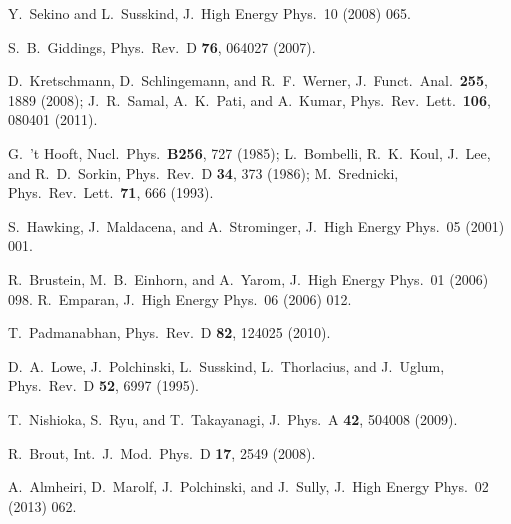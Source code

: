 \documentclass[aps,showpacs,prl,12pt]{revtex4}
\begin{document}
\begin{thebibliography}{16}
 Y.\ Sekino and L.\ Susskind,
J.\ High Energy Phys.\ 10 (2008) 065.

 S.\ B.\ Giddings,
Phys.\ Rev.\ D {\bf 76}, 064027 (2007).

 D.\ Kretschmann, D.\ Schlingemann, and R.\ F.\ Werner,
J.\ Funct.\ Anal.\ {\bf 255}, 1889 (2008);
J.\ R.\ Samal, A.\ K.\ Pati, and A.\ Kumar,
Phys.\ Rev.\ Lett.\ {\bf 106}, 080401 (2011).

 G.\ 't Hooft,
Nucl.\ Phys.\ {\bf B256}, 727 (1985);
%
L.\ Bombelli, 
R.\ K.\ Koul, J.\ Lee, and R.\ D.\ Sorkin,
Phys.\ Rev.\ D {\bf 34}, 373 (1986);
%
M.\ Srednicki,
Phys.\ Rev.\ Lett.\ {\bf 71}, 666 (1993).

S.\ Hawking, J.\ Maldacena, and A.\ Strominger,
J.\ High Energy Phys.\ 05 (2001) 001.

R.\ Brustein, M.\ B.\ Einhorn, and A.\ Yarom,
J.\ High Energy Phys.\ 01 (2006) 098.
%
R.\ Emparan,
J.\ High Energy Phys.\ 06 (2006) 012.

 T.\ Padmanabhan,
Phys.\ Rev.\ D {\bf 82}, 124025 (2010).


 D.\ A.\ Lowe,
J.\ Polchinski, L.\ Susskind, L.\ Thorlacius, and J.\ Uglum,
Phys.\ Rev.\ D {\bf 52}, 6997 (1995).


 T.\ Nishioka, S.\ Ryu, and T.\ Takayanagi,
J.\ Phys.\ A {\bf 42}, 504008 (2009).

 R.\ Brout,
Int.\ J.\ Mod.\ Phys.\ D {\bf 17}, 2549 (2008).

 A.\ Almheiri, 
D.\ Marolf, J.\ Polchinski, and J.\ Sully,
J.\ High Energy Phys.\ 02 (2013) 062.


\end{thebibliography}
\end{document}
